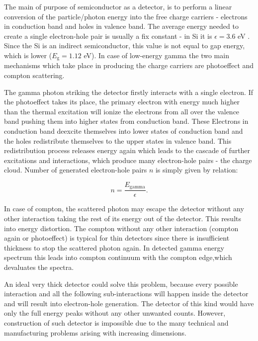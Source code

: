 \par
The main of purpose of semiconductor as a detector, is to perform a linear conversion of the particle/photon energy into the free charge carriers - electrons in conduction band and holes in valence band. The average energy needed to create a single electron-hole pair is usually a fix constant - in Si it is $\epsilon = 3.6$ eV \cite{Lutz_2007}. Since the Si is an indirect semiconductor, this value is not equal to gap energy, which is lower ($E_{\textrm{g}} = 1.12$ eV). In case of low-energy gamma the two main mechanisms which take place in producing the charge carriers are photoeffect and compton scattering. 

\par
The gamma photon striking the detector firstly interacts with a single electron. If the photoeffect takes its place, the primary electron with energy much higher than the thermal excitation will ionize the electrons from all over the valence band pushing them into higher states from conduction band. These Electrons in conduction band deexcite themselves into lower states of conduction band and the holes redistribute themselves to the upper states in valence band. This redistribution process releases energy again which leads to the cascade of further excitations and interactions, which produce many electron-hole pairs - the charge cloud. Number of generated electron-hole pairs $n$ is simply given by relation:


\begin{equation}
n = \frac{E_{\textrm{gamma}}}{\epsilon}.
\end{equation}

\par
In case of compton, the scattered photon may escape the detector without any other interaction taking the rest of its energy out of the detector. This results into energy distortion. The compton without any other interaction (compton again or photoeffect) is typical for thin detectors since there is insufficient thickness to stop the scattered photon again. In detected gamma energy spectrum this leads into compton continuum with the compton edge,which devaluates the spectra.

\par
An ideal very thick detector could solve this problem, because every possible interaction and all the following sub-interactions will happen inside the detector and will result into electron-hole generation. The detector of this kind would have only the full energy peaks without any other unwanted counts. However, construction of such detector is impossible due to the many technical and manufacturing problems arising with increasing dimensions. 

